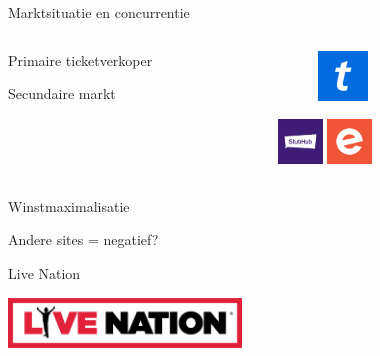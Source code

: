 \documentclass{beamer}
\begin{document}
\begin{frame}{Marktsituatie en concurrentie}
    \begin{columns}
        \begin{column}{.6\textwidth}
            \begin{itemize}
                \LARGE{
                    \item Primaire ticketverkoper
                    \item Secundaire markt
                }
            \end{itemize}
        \end{column}
        \begin{column}{.4\textwidth}
            \begin{figure}
                \includegraphics[width=50px,height=50px,keepaspectratio]{ticketmaster-logo.png}
            \end{figure}
            \centering
            \includegraphics[width=45px,height=45px,keepaspectratio]{stubhub-logo.png}
            \includegraphics[width=45px,height=45px,keepaspectratio]{eventbrite-logo.png}
        \end{column}
    \end{columns}
\end{frame}


\begin{frame}{Winstmaximalisatie}
    \begin{itemize}
        \LARGE{
            \item Andere sites = negatief?
            \item Live Nation
        }
    \end{itemize}
    \begin{center}
        \includegraphics[height=50px, keepaspectratio]{livenation_logo.png}
    \end{center}
\end{frame}
\end{document}
